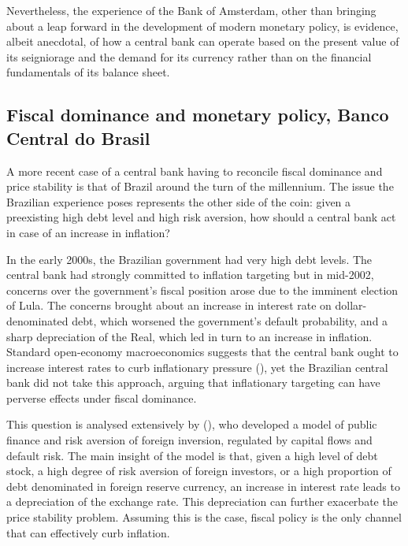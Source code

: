 \documentclass[american]{scrartcl}
\newcommand{\citein}[1]{\citeauthor{#1} (\citeyear{#1})}
\begin{document}
Nevertheless, the experience of the Bank of Amsterdam, other than bringing about a leap forward in the development of modern monetary policy, is evidence, albeit anecdotal, of how a central bank can operate based on the present value of its seigniorage and the demand for its currency rather than on the financial fundamentals of its balance sheet.


\subsection{Fiscal dominance and monetary policy, Banco Central do Brasil}

A more recent case of a central bank having to reconcile fiscal dominance and price stability is that of Brazil around the turn of the millennium. The issue the Brazilian experience poses represents the other side of the coin: given a preexisting high debt level and high risk aversion, how should a central bank act in case of an increase in inflation?

In the early 2000s, the Brazilian government had very high debt levels. The central bank had strongly committed to inflation targeting but in mid-2002, concerns over the government's fiscal position arose due to the imminent election of Lula. The concerns brought about an increase in interest rate on dollar-denominated debt, which worsened the government's default probability, and a sharp depreciation of the Real, which led in turn to an increase in inflation. Standard open-economy macroeconomics suggests that the central bank ought to increase interest rates to curb inflationary pressure (\cite[p. 3]{Blanchard2004}), yet the Brazilian central bank did not take this approach, arguing that inflationary targeting can have perverse effects under fiscal dominance.

This question is analysed extensively by \citein{Blanchard2004}, who developed a model of public finance and risk aversion of foreign inversion, regulated by capital flows and default risk. The main insight of the model is that, given a high level of debt stock, a high degree of risk aversion of foreign investors, or a high proportion of debt denominated in foreign reserve currency, an increase in interest rate leads to a depreciation of the exchange rate. This depreciation can further exacerbate the price stability problem. Assuming this is the case, fiscal policy is the only channel that can effectively curb inflation.
\end{document}
